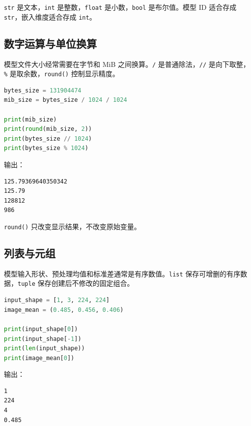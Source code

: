 \passthrough{\lstinline!str!} 是文本，\passthrough{\lstinline!int!}
是整数，\passthrough{\lstinline!float!}
是小数，\passthrough{\lstinline!bool!} 是布尔值。模型 ID 适合存成
\passthrough{\lstinline!str!}，嵌入维度适合存成
\passthrough{\lstinline!int!}。

\subsection{数字运算与单位换算}\label{ux6570ux5b57ux8fd0ux7b97ux4e0eux5355ux4f4dux6362ux7b97}

模型文件大小经常需要在字节和 MiB 之间换算。\passthrough{\lstinline!/!}
是普通除法，\passthrough{\lstinline!//!}
是向下取整，\passthrough{\lstinline!\%!}
是取余数，\passthrough{\lstinline!round()!} 控制显示精度。

\begin{lstlisting}[language=Python]
bytes_size = 131904474
mib_size = bytes_size / 1024 / 1024

print(mib_size)
print(round(mib_size, 2))
print(bytes_size // 1024)
print(bytes_size % 1024)
\end{lstlisting}

输出：

\begin{lstlisting}
125.79369640350342
125.79
128812
986
\end{lstlisting}

\passthrough{\lstinline!round()!} 只改变显示结果，不改变原始变量。

\subsection{列表与元组}\label{ux5217ux8868ux4e0eux5143ux7ec4}

模型输入形状、预处理均值和标准差通常是有序数值。\passthrough{\lstinline!list!}
保存可增删的有序数据，\passthrough{\lstinline!tuple!}
保存创建后不修改的固定组合。

\begin{lstlisting}[language=Python]
input_shape = [1, 3, 224, 224]
image_mean = (0.485, 0.456, 0.406)

print(input_shape[0])
print(input_shape[-1])
print(len(input_shape))
print(image_mean[0])
\end{lstlisting}

输出：

\begin{lstlisting}
1
224
4
0.485
\end{lstlisting}

